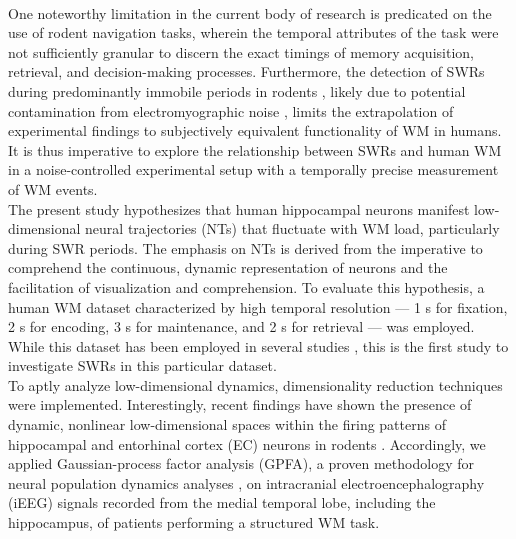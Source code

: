 \documentclass[preprint,review,12pt]{elsarticle}%
\begin{document}
\\
\indent
One noteworthy limitation in the current body of research is predicated on the use of rodent navigation tasks, wherein the temporal attributes of the task were not sufficiently granular to discern the exact timings of memory acquisition, retrieval, and decision-making processes. Furthermore, the detection of SWRs during predominantly immobile periods in rodents \cite{foster_reverse_2006, karlsson_awake_2009, carr_hippocampal_2011, pfeiffer_hippocampal_2013, jadhav_awake_2012, singer_hippocampal_2013, fernandez-ruiz_long-duration_2019}, likely due to potential contamination from electromyographic noise \cite{Watanabe_2021}, limits the extrapolation of experimental findings to subjectively equivalent functionality of WM in humans. It is thus imperative to explore the relationship between SWRs and human WM in a noise-controlled experimental setup with a temporally precise measurement of WM events.
\\
\indent
The present study hypothesizes that human hippocampal neurons manifest low-dimensional neural trajectories (NTs) that fluctuate with WM load, particularly during SWR periods. The emphasis on NTs is derived from the imperative to comprehend the continuous, dynamic representation of neurons and the facilitation of visualization and comprehension. To evaluate this hypothesis, a human WM dataset characterized by high temporal resolution --- 1 s for fixation, 2 s for encoding, 3 s for maintenance, and 2 s for retrieval --- \cite{boran_dataset_2020} was employed. While this dataset has been employed in several studies \cite{li_functional_2023, sheybani_wake_2023, li_anteriorposterior_2022, li_thetaalpha_2024, ye_phase-amplitude_2022, cocina_spiking_2022, dimakopoulos_information_2022}, this is the first study to investigate SWRs in this particular dataset.
\\
\indent
To aptly analyze low-dimensional dynamics, dimensionality reduction techniques were implemented. Interestingly, recent findings have shown the presence of dynamic, nonlinear low-dimensional spaces within the firing patterns of hippocampal \cite{zhang_hippocampal_2022} and entorhinal cortex (EC) neurons in rodents \cite{gardner_toroidal_2022}. Accordingly, we applied Gaussian-process factor analysis (GPFA), a proven methodology for neural population dynamics analyses \cite{yu_gaussian-process_2009, churchland_stimulus_2010, lin_functional_2011, churchland_neural_2012, ecker_state_2014, kao_single-trial_2015, gallego_neural_2017, wei_orderly_2019, kim_corticalhippocampal_2023}, on intracranial electroencephalography (iEEG) signals recorded from the medial temporal lobe, including the hippocampus, of patients performing a structured WM task.
\end{document}

